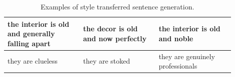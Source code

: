 \documentclass[letterpaper]{article}
\begin{document}
\begin{table}[!t]
\begin{tabular}{| p{0.3\linewidth} || p{0.3\linewidth} | p{0.3\linewidth} |}
		the interior is old and generally falling apart                         & the decor is old and now perfectly                                        & the interior is old and noble                              \\ \hline
		they are clueless                                                       & they are stoked                                                           & they are genuinely professionals                           \\ \hline
	\end{tabular}
	\caption{Examples of style transferred sentence generation.}
	\label{tab:transfer-samples}
\end{table}




\end{document}
